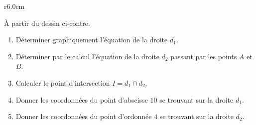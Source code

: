
\begin{exercice}\label{exosmath-0695}

\begin{wrapfigure}{r}{6.0cm}
   \vspace{-1.5cm}        %
   \centering
   
\end{wrapfigure}

    À partir du dessin ci-contre.
    \begin{enumerate}
        \item
            Déterminer graphiquement l'équation de la droite \( d_1\).
        \item
            Déterminer par le calcul l'équation de la droite \( d_2\) passant par les points \( A\) et \( B\).
        \item
            Calculer le point d'intersection \( I=d_1\cap d_2\).
        \item
            Donner les coordonnées du point d'abscisse \( 10\) se trouvant sur la droite \( d_1\).
        \item
            Donner les coordonnées du point d'ordonnée \( 4\) se trouvant sur la droite \( d_2\).
    \end{enumerate}

\end{exercice}
